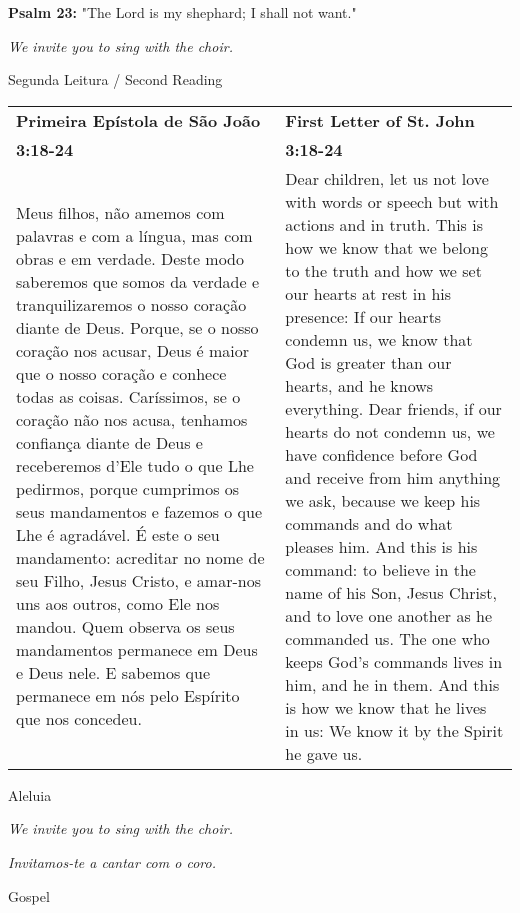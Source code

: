 {\bf Psalm 23:} "The Lord is my shephard; I shall not want."

{\it We invite you to sing with the choir.}

\newpage
{\large Segunda Leitura / Second Reading}

\begin{longtable}{p{2in}p{2in}}
  {\bf Primeira Epístola de São João} & \hfill{\bf First Letter of St. John}\\
  {\bf 3:18-24}&\hfill{\bf 3:18-24}\\
Meus filhos,
não amemos com palavras e com a língua,
mas com obras e em verdade.
Deste modo saberemos que somos da verdade
e tranquilizaremos o nosso coração diante de Deus.
Porque, se o nosso coração nos acusar,
Deus é maior que o nosso coração
e conhece todas as coisas.
Caríssimos, se o coração não nos acusa,
tenhamos confiança diante de Deus
e receberemos d’Ele tudo o que Lhe pedirmos,
porque cumprimos os seus mandamentos
e fazemos o que Lhe é agradável.
É este o seu mandamento:
acreditar no nome de seu Filho, Jesus Cristo,
e amar-nos uns aos outros, como Ele nos mandou.
Quem observa os seus mandamentos
permanece em Deus e Deus nele.
E sabemos que permanece em nós
pelo Espírito que nos concedeu.
&
Dear children, let us not love with words or speech but with actions and in truth.
This is how we know that we belong to the truth and how we set our hearts at rest in his presence: If our hearts condemn us, we know that God is greater than our hearts, and he knows everything. Dear friends, if our hearts do not condemn us, we have confidence before God and receive from him anything we ask, because we keep his commands and do what pleases him. And this is his command: to believe in the name of his Son, Jesus Christ, and to love one another as he commanded us. The one who keeps God’s commands lives in him, and he in them. And this is how we know that he lives in us: We know it by the Spirit he gave us.
\end{longtable}

{\large Aleluia}

{\it We invite you to sing with the choir.}

{\it Invitamos-te a cantar com o coro.}

\vspace{20pt}

{\large Gospel}

